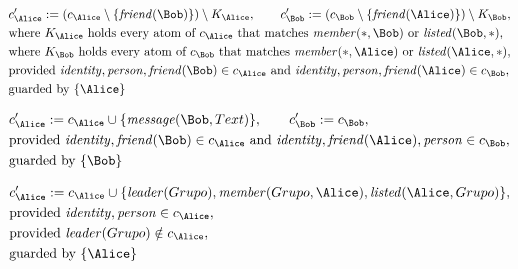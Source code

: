 \begin{align*}
&
c'_
{
\Alice
}
 := 
(c_
{
\Alice
}
 \setminus 
\{
\mathit{\detokenize{
friend
}}
(
\Bob
)
\}
) \setminus K_
{
\Alice
}
, \qquad 
c'_
{
\Bob
}
 := 
(c_
{
\Bob
}
 \setminus 
\{
\mathit{\detokenize{
friend
}}
(
\Alice
)
\}
) \setminus K_
{
\Bob
}
,\\
&
\text{where } K_
{
\Alice
}
 \text{ holds every atom of } c_
{
\Alice
}
 \text{ that matches } 
\mathit{\detokenize{
member
}}
(
\ast
,
\Bob
)
 \text{ or } 
\mathit{\detokenize{
listed
}}
(
\Bob
,
\ast
)
,\\
&
\text{where } K_
{
\Bob
}
 \text{ holds every atom of } c_
{
\Bob
}
 \text{ that matches } 
\mathit{\detokenize{
member
}}
(
\ast
,
\Alice
)
 \text{ or } 
\mathit{\detokenize{
listed
}}
(
\Alice
,
\ast
)
,\\
&
\text{provided } 
\mathit{\detokenize{
identity
}}
,
\mathit{\detokenize{
person
}}
,
\mathit{\detokenize{
friend
}}
(
\Bob
)
 \in c_
{
\Alice
}
 \text{ and } 
\mathit{\detokenize{
identity
}}
,
\mathit{\detokenize{
person
}}
,
\mathit{\detokenize{
friend
}}
(
\Alice
)
 \in c_
{
\Bob
}
,\\
&
\text{guarded by } \{
\Alice
\}
\end{align*}

\begin{align*}
&
c'_
{
\Alice
}
 := 
c_
{
\Alice
}
 \cup 
\{
\mathit{\detokenize{
message
}}
(
\Bob
,
Text
)
\}
, \qquad 
c'_
{
\Bob
}
 := 
c_
{
\Bob
}
,\\
&
\text{provided } 
\mathit{\detokenize{
identity
}}
,
\mathit{\detokenize{
friend
}}
(
\Bob
)
 \in c_
{
\Alice
}
 \text{ and } 
\mathit{\detokenize{
identity
}}
,
\mathit{\detokenize{
friend
}}
(
\Alice
)
,
\mathit{\detokenize{
person
}}
 \in c_
{
\Bob
}
,\\
&
\text{guarded by } \{
\Bob
\}
\end{align*}

\begin{align*}
&
c'_
{
\Alice
}
 := 
c_
{
\Alice
}
 \cup 
\{
\mathit{\detokenize{
leader
}}
(
Grupo
)
,
\mathit{\detokenize{
member
}}
(
Grupo
,
\Alice
)
,
\mathit{\detokenize{
listed
}}
(
\Alice
,
Grupo
)
\}
,\\
&
\text{provided } 
\mathit{\detokenize{
identity
}}
,
\mathit{\detokenize{
person
}}
 \in c_
{
\Alice
}
,\\
&
\text{provided } 
\mathit{\detokenize{
leader
}}
(
Grupo
)
 \notin c_
{
\Alice
}
,\\
&
\text{guarded by } \{
\Alice
\}
\end{align*}
